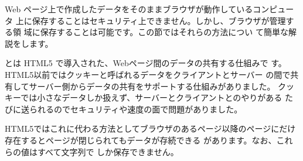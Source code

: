 Web ページ上で作成したデータをそのままブラウザが動作しているコンピュータ
上に保存することはセキュリティ上できません。しかし、ブラウザが管理する領
域に保存することは可能です。この節ではそれらの方法につい
て簡単な解説をします。

とは HTML5 で導入された、Webページ間のデータの共有する仕組みで
す。HTML5以前ではクッキーと呼ばれるデータをクライアントとサーバー
の間で共有してサーバー側からデータの共有をサポートする仕組みがありました。
クッキーでは小さなデータしか扱えず、サーバーとクライアントとのやりがある
たびに送られるのでセキュリティや速度の面で問題がありました。

HTML5ではこれに代わる方法としてブラウザのあるページ以降のページにだけ
存在するとページが閉じられてもデータが存続できる
があります。なお、これらの値はすべて文字列で
しか保存できません。

